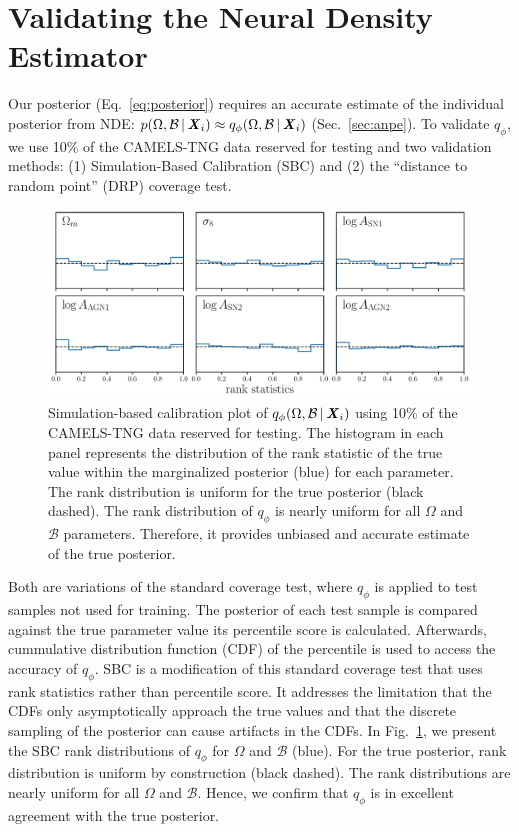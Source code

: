 \section{Validating the Neural Density Estimator} \label{sec:valid}
Our posterior (Eq.~\ref{eq:posterior}) requires an accurate estimate of the
individual posterior from NDE: 
$p(\Omega, \mathcal{B}\,|\, {\textbf{\textit{X}}_i}) \approx q_\phi(\Omega, \mathcal{B}\,|\, {\textbf{\textit{X}}_i})$
(Sec.~\ref{sec:anpe}). 
To validate $q_\phi$, we use 10\% of the CAMELS-TNG data reserved for testing
and two validation methods: (1) Simulation-Based Calibration (SBC) and (2)
the ``distance to random point'' (DRP) coverage test. 

\begin{figure}[ht]
\vskip 0.2in
\begin{center}
    \centerline{\includegraphics[width=0.9\columnwidth]{figs/ranks_p_omega_x.pdf}}
    \caption{
        Simulation-based calibration plot of 
        $q_\phi(\Omega, \mathcal{B}\,|\, {\textbf{\textit{X}}_i})$ using 10\% of the
        CAMELS-TNG data reserved for testing.
        The histogram in each panel represents the distribution of the rank
        statistic of the true value within the marginalized posterior (blue)
        for each parameter. 
        The rank distribution is uniform for the true posterior (black dashed).
        The rank distribution of $q_\phi$ is nearly uniform for all $\Omega$
        and $\mathcal{B}$ 
        parameters. 
        Therefore, it provides unbiased and accurate estimate of the true
        posterior.
    }\label{fig:ranks}
\end{center}
\vskip -0.2in
\end{figure}

Both are variations of the standard coverage test, where $q_\phi$ is applied to
test samples not used for training. 
The posterior of each test sample is compared against the true parameter value
its percentile score is calculated.
Afterwards, cummulative distribution function (CDF) of the percentile is used
to access the accuracy of $q_\phi$.
SBC is a modification of this standard coverage test that uses rank statistics
rather than percentile score. 
It addresses the limitation that the CDFs only asymptotically approach the true
values and that the discrete sampling of the posterior can cause artifacts in
the CDFs. 
In Fig.~\ref{fig:ranks}, we present the SBC rank distributions of $q_\phi$ for
$\Omega$ and $\mathcal{B}$ (blue). 
For the true posterior, rank distribution is uniform by construction (black
dashed).
The rank distributions are nearly uniform for all $\Omega$ and
$\mathcal{B}$.
Hence, we confirm that $q_\phi$ is in excellent agreement with the true
posterior.


